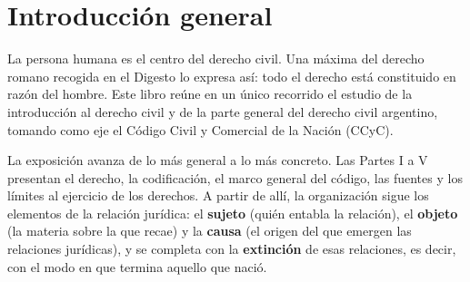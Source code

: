 \documentclass[12pt,oneside]{book}
\begin{document}
\frontmatter
\tableofcontents

\mainmatter

\chapter*{Introducción general}
{}

La persona humana es el centro del derecho civil. Una máxima del derecho romano recogida en el Digesto lo expresa así: todo el derecho está constituido en razón del hombre. Este libro reúne en un único recorrido el estudio de la introducción al derecho civil y de la parte general del derecho civil argentino, tomando como eje el Código Civil y Comercial de la Nación (CCyC).

La exposición avanza de lo más general a lo más concreto. Las Partes I a V presentan el derecho, la codificación, el marco general del código, las fuentes y los límites al ejercicio de los derechos. A partir de allí, la organización sigue los elementos de la relación jurídica: el \textbf{sujeto} (quién entabla la relación), el \textbf{objeto} (la materia sobre la que recae) y la \textbf{causa} (el origen del que emergen las relaciones jurídicas), y se completa con la \textbf{extinción} de esas relaciones, es decir, con el modo en que termina aquello que nació.
\end{document}
